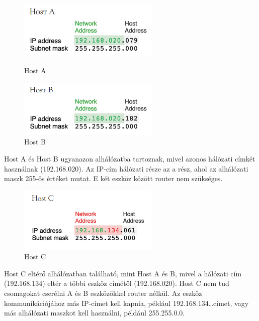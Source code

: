 \begin{figure}[H]
    \centering
    \begin{minipage}{0.45\textwidth}
        \centering
        \includegraphics[width=67mm, keepaspectratio]{figures/host_a.png}
        \caption{Host A}
    \end{minipage}\hfill
    \begin{minipage}{0.45\textwidth}
        \centering
        \includegraphics[width=67mm, keepaspectratio]{figures/host_b.png}
        \caption{Host B}
    \end{minipage}
\end{figure}

Host A és Host B ugyanazon alhálózatba tartoznak, mivel azonos hálózati címkét
használnak (192.168.020). Az IP-cím hálózati része az a rész, ahol az
alhálózati maszk 255-ös értéket mutat. E két eszköz között router nem szükséges.

\begin{figure}[H]
	\centering
	\includegraphics[width=67mm, keepaspectratio]{figures/host_c.png}
	\caption{Host C}
	\label {fig:host_c}
\end{figure}

Host C eltérő alhálózatban található, mint Host A és B, mivel a hálózati cím
(192.168.134) eltér a többi eszköz címétől (192.168.020). Host C nem tud
csomagokat cserélni A és B eszközökkel router nélkül. Az eszköz kommunikációjához
más IP-címet kell kapnia, például 192.168.134\ldots címet, vagy más
alhálózati maszkot kell használni, például 255.255.0.0.

